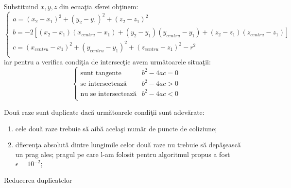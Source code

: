 	Substituind $x, y, z$ din ecua\c{t}ia sferei ob\c{t}inem:
	\begin{equation}
		\begin{cases}
			a = (x_2 - x_1)^2 + (y_2 - y_1)^2 + (z_2 - z_1)^2\\
			b = -2[(x_2-x_1)(x_{centru}-x_1) + (y_2 - y_1)(y_{centru} - y_1) + (z_2 - z_1)(z_{centru} - z_1)]\\
			c = (x_{centru}-x_1)^2 + (y_{centru}-y_1)^2 + (z_{centru}-z_1)^2 - r^2\\
		\end{cases}
	\end{equation}
	iar pentru a verifica condi\c{t}ia de intersec\c{t}ie avem urm\u{a}toarele situa\c{t}ii:
	\begin{equation}
		\begin{cases}
			\text{sunt tangente} & b^2-4ac = 0\\
			\text{se intersecteaz\u{a}}& b^2-4ac>0\\
			\text{nu se intersecteaz\u{a}}& b^2-4ac<0\\
		\end{cases}
	\end{equation}
	\bigskip
	
	Dou\u{a} raze sunt duplicate dac\u{a} urm\u{a}toarele condi\c{t}ii sunt adev\u{a}rate:
	
	\begin{enumerate}
		\item cele dou\u{a} raze trebuie s\u{a} aib\u{a} acela\c{s}i num\u{a}r de puncte de coliziune;
		
		\item dfieren\c{t}a absolut\u{a} dintre lungimile celor dou\u{a} raze nu trebuie s\u{a} dep\u{a}\c{s}easc\u{a} un prag ales; pragul pe care l-am folosit pentru algoritmul propus a fost $\epsilon = 10^{-2}$;
	\end{enumerate}
	\bigskip
	
	\begin{algorithm}
		\caption{Reducerea duplicatelor}
		\label{duplicate}
		\begin{algorithmic}[2]	
			\EndIf
			\EndIf
			\EndWhile
			\EndProcedure
		\end{algorithmic}
	\end{algorithm}
	\bigskip

